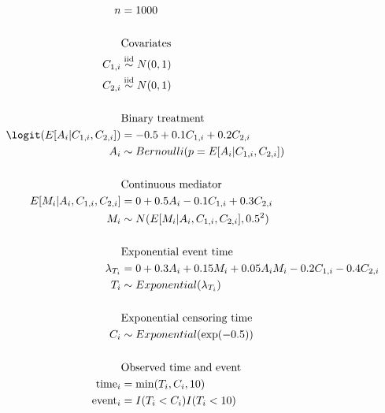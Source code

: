 \documentclass[10pt]{article}
\begin{document}
\begin{align*}
  n
  &= 1000\\
  \\
  &\text{Covariates}\\
  C_{1,i} &\overset{\text{iid}}{\sim} N(0,1)\\
  C_{2,i} &\overset{\text{iid}}{\sim} N(0,1)\\
  \\
  &\text{Binary treatment}\\
  \logit(E[A_{i} | C_{1,i}, C_{2,i}])
  &= -0.5 + 0.1 C_{1,i} + 0.2 C_{2,i}\\
  A_{i} &\sim Bernoulli(p = E[A_{i} | C_{1,i}, C_{2,i}])\\
  \\
  &\text{Continuous mediator}\\
  E[M_{i} | A_{i}, C_{1,i}, C_{2,i}]
  &= 0 + 0.5 A_{i} - 0.1 C_{1,i} + 0.3 C_{2,i}\\
  M_{i} &\sim N(E[M_{i} | A_{i}, C_{1,i}, C_{2,i}], 0.5^{2})\\
  \\
  &\text{Exponential event time}\\
  \lambda_{T_{i}} &= 0 + 0.3 A_{i} + 0.15 M_{i} + 0.05 A_{i}M_{i} -0.2 C_{1,i} - 0.4 C_{2,i}\\
  T_{i} &\sim Exponential(\lambda_{T_{i}})\\
  \\
  &\text{Exponential censoring time}\\
  C_{i} &\sim Exponential(\exp(-0.5))\\
  \\
  &\text{Observed time and event}\\
  \text{time}_{i} &= \min(T_{i}, C_{i}, 10)\\
  \text{event}_{i} &= I(T_{i} < C_{i}) I(T_{i} < 10)\\
\end{align*}
\end{document}
